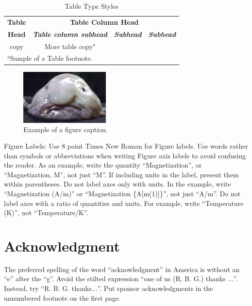 \documentclass[conference]{IEEEtran}
\begin{document}
\begin{table}[htbp]
\caption{Table Type Styles}
\begin{center}
\begin{tabular}{|c|c|c|c|}
\hline
\textbf{Table}&\multicolumn{3}{|c|}{\textbf{Table Column Head}} \\
\cline{2-4} 
\textbf{Head} & \textbf{\textit{Table column subhead}}& \textbf{\textit{Subhead}}& \textbf{\textit{Subhead}} \\
\hline
copy& More table copy$^{\mathrm{a}}$& &  \\
\hline
\multicolumn{4}{l}{$^{\mathrm{a}}$Sample of a Table footnote.}
\end{tabular}
\label{tab1}
\end{center}
\end{table}

\begin{figure}[htbp]
\centerline{\includegraphics[width=0.4\textwidth]{fig1}}
\caption{Example of a figure caption.}
\label{fig}
\end{figure}

Figure Labels: Use 8 point Times New Roman for Figure labels. Use words 
rather than symbols or abbreviations when writing Figure axis labels to 
avoid confusing the reader. As an example, write the quantity 
``Magnetization'', or ``Magnetization, M'', not just ``M''. If including 
units in the label, present them within parentheses. Do not label axes only 
with units. In the example, write ``Magnetization (A/m)'' or ``Magnetization 
\{A[m(1)]\}'', not just ``A/m''. Do not label axes with a ratio of 
quantities and units. For example, write ``Temperature (K)'', not 
``Temperature/K''.

\section*{Acknowledgment}

The preferred spelling of the word ``acknowledgment'' in America is without 
an ``e'' after the ``g''. Avoid the stilted expression ``one of us (R. B. 
G.) thanks $\ldots$''. Instead, try ``R. B. G. thanks$\ldots$''. Put sponsor 
acknowledgments in the unnumbered footnote on the first page.
\end{document}
